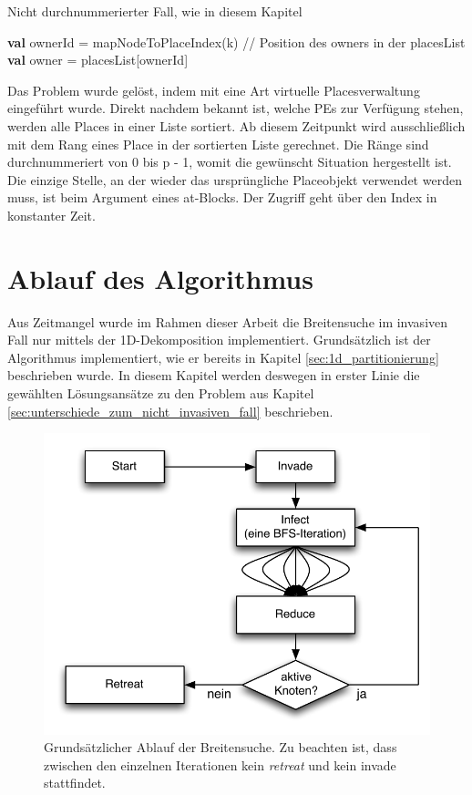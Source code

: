 \begin{algorithm}
	\caption{Nicht durchnummerierter Fall, wie in diesem Kapitel}
	\label{alg:owner_random}
	\begin{algorithmic}[1]
		\State \textbf{val} ownerId = mapNodeToPlaceIndex(k) // Position des owners in der placesList
		\State \textbf{val} owner   = placesList[ownerId]
	\end{algorithmic}
\end{algorithm}

Das Problem wurde gelöst, indem mit eine Art virtuelle Placesverwaltung eingeführt wurde. Direkt nachdem bekannt ist, welche PEs zur Verfügung stehen, werden alle Places in einer Liste sortiert. Ab diesem Zeitpunkt wird ausschließlich mit dem Rang eines Place in der sortierten Liste gerechnet. Die Ränge sind durchnummeriert von 0 bis p - 1, womit die gewünscht Situation hergestellt ist. Die einzige Stelle, an der wieder das ursprüngliche Placeobjekt verwendet werden muss, ist beim Argument eines at{}-Blocks. Der Zugriff geht über den Index in konstanter Zeit.

\section{Ablauf des Algorithmus} %
\label{sec:ablauf_des_algorithmus}
Aus Zeitmangel wurde im Rahmen dieser Arbeit die Breitensuche im invasiven Fall nur mittels der 1D-Dekomposition implementiert. Grundsätzlich ist der Algorithmus implementiert, wie er bereits in Kapitel \ref{sec:1d_partitionierung} beschrieben wurde. In diesem Kapitel werden deswegen in erster Linie die gewählten Lösungsansätze zu den Problem aus Kapitel \ref{sec:unterschiede_zum_nicht_invasiven_fall} beschrieben.
\begin{figure}[ht]
	\centering
	\label{img:invasive-flow}
	\includegraphics{pics/invasive-flow.pdf}
	\caption{Grundsätzlicher Ablauf der Breitensuche. Zu beachten ist, dass zwischen den einzelnen Iterationen kein \textit{retreat} und kein invade stattfindet.}
\end{figure}

